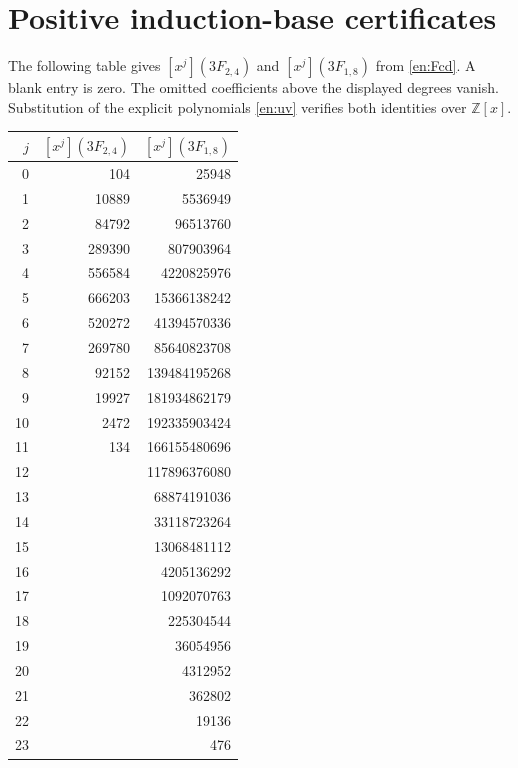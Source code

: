 \documentclass[12pt]{amsart}
\theoremstyle{definition}
\theoremstyle{remark}
\numberwithin{equation}{section}
\begin{document}
\section{Positive induction-base certificates}
The following table gives $[x^j](3F_{2,4})$ and $[x^j](3F_{1,8})$ from
\eqref{en:Fcd}. A blank entry is zero. The omitted coefficients above the
displayed degrees vanish. Substitution of the explicit polynomials
\eqref{en:uv} verifies both identities over $\mathbb Z[x]$.
\begin{center}\small
\begin{tabular}{r|r|r}
$j$&$[x^j](3F_{2,4})$&$[x^j](3F_{1,8})$\\\hline
0&104&25948\\
1&10889&5536949\\
2&84792&96513760\\
3&289390&807903964\\
4&556584&4220825976\\
5&666203&15366138242\\
6&520272&41394570336\\
7&269780&85640823708\\
8&92152&139484195268\\
9&19927&181934862179\\
10&2472&192335903424\\
11&134&166155480696\\
12&&117896376080\\
13&&68874191036\\
14&&33118723264\\
15&&13068481112\\
16&&4205136292\\
17&&1092070763\\
18&&225304544\\
19&&36054956\\
20&&4312952\\
21&&362802\\
22&&19136\\
23&&476
\end{tabular}
\end{center}
\end{document}
